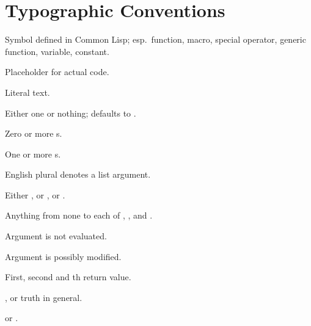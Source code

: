 %
%
\section*{Typographic Conventions}

\begin{LIST}{1cm}

  {
  Symbol defined in Common Lisp; esp.\ function, macro, special
  operator, generic function, variable, constant. 
  }

  {
  Placeholder for actual code.
  }

  {
  Literal text.
  }

  {
  Either one  or nothing; defaults to .
  }

  {
  Zero or more s.
  }

  {
  One or more s.
  }

  {
  English plural denotes a list argument.
  }

  {
  Either , or , or .
  }

  {
  Anything from none to each of , , and .
  }

  {
  Argument  is not evaluated.
  }

  {
  Argument  is possibly modified.
  }

  {
  First, second and th return value.
  }

  \IT{\T\qquad\qquad\qquad\qquad}
  {
  , or truth in general.
  }
  
  \IT{\NIL\qquad\qquad\qquad}
  {
   or \kwd{()}.
  }

\end{LIST}

